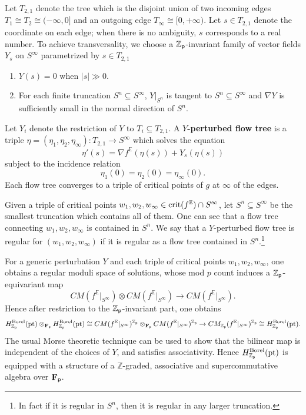 \documentclass[reqno, 10pt]{amsart}
\numberwithin{equation}{section}
\numberwithin{equation}{section}
\renewcommand{\subset}{\subseteq}
\theoremstyle{definition}
\theoremstyle{remark}
\newcommand{\beqn}{\begin{equation*}}
\newcommand{\eeqn}{\end{equation*}}
\newcommand{\mb}{\mathbb}
\newcommand{\fp}{{\bf F}_{\sf p}}
\newcommand{\zp}{{{\mb Z}_{\sf p}}}
\newcommand{\ep}{{{\mathbb E}}}
\begin{document}
Let $T_{2, 1}$ denote the tree which is the disjoint union of two incoming edges $T_1\cong T_2 \cong (-\infty, 0]$ and an outgoing edge $T_\infty \cong [0, +\infty)$. Let $s \in T_{2,1}$ denote the coordinate on each edge; when there is no ambiguity, $s$ corresponds to a real number. To achieve transversality, we choose a $\zp$-invariant family of vector fields $Y_s$ on $S^\infty$ parametrized by $s \in T_{2,1}$
\begin{enumerate}

\item $Y (s) = 0$ when $|s|\gg 0$. 

\item For each finite truncation $S^n \subset S^\infty$, $Y|_{S^n}$ is tangent to $S^n \subset S^\infty$ and $\nabla Y$ is sufficiently small in the normal direction of $S^n$.
\end{enumerate}
Let $Y_i$ denote the restriction of $Y$ to $T_i \subset T_{2,1}$. A {\bf $Y$-perturbed flow tree} is a triple $\eta = (\eta_1, \eta_2, \eta_\infty): T_{2,1} \to S^\infty$ which solves the equation
\beqn
\eta'(s) = \nabla f^\ep (\eta(s)) + Y_s(\eta(s))
\eeqn
subject to the incidence relation
\beqn
\eta_1(0) = \eta_2(0) = \eta_\infty(0).
\eeqn
Each flow tree converges to a triple of critical points of $g$ at $\infty$ of the edges.

Given a triple of critical points $w_1, w_2, w_\infty \in {\rm crit}(f^\ep) \cap S^\infty$, let $S^n \subset S^\infty$ be the smallest truncation which contains all of them. One can see that a flow tree connecting $w_1, w_2, w_\infty$ is contained in $S^n$. We say that a $Y$-perturbed flow tree is regular for $(w_1, w_2, w_\infty)$ if it is regular as a flow tree contained in $S^n$.\footnote{In fact if it is regular in $S^n$, then it is regular in any larger truncation.}
 
For a generic perturbation $Y$ and each triple of critical points $w_1, w_2, w_\infty$, one obtains a regular moduli space of solutions, whose mod $p$ count induces a $\zp$-equivariant map
\beqn
CM( f^\ep|_{S^\infty} ) \otimes CM(f^\ep|_{S^\infty} ) \to CM( f^\ep|_{S^\infty} ).
\eeqn
Hence after restriction to the $\zp$-invariant part, one obtains
\beqn
H_{\zp}^{\rm Borel} ({\rm pt}) \otimes_{\fp} H_{\zp}^{\rm Borel}({\rm pt})  \cong CM(f^\ep|_{S^\infty})^{\zp}\otimes_{\fp} CM(f^\ep|_{S^\infty})^{\zp} \to CM_{\zp} (f^\ep|_{S^\infty})^{\zp}\cong H_{\zp}^{\rm Borel}({\rm pt}).
\eeqn 
The usual Morse theoretic technique can be used to show that the bilinear map is independent of the choices of $Y$, and satisfies associativity. Hence $H_{\zp}^{\rm Borel}({\rm pt})$ is equipped with a structure of a ${\mb Z}$-graded, associative and supercommutative algebra over $\fp$. 
\end{document}
